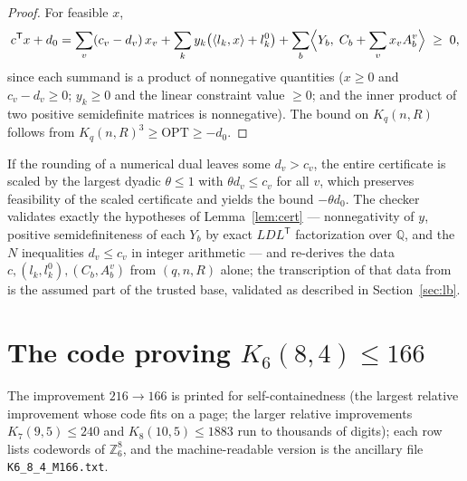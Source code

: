 \documentclass[11pt]{amsart}
\newcommand{\Kq}[3]{K_{#1}(#2,#3)}
\begin{document}
\begin{proof}
For feasible $x$,
\[
c^{\mathsf T}x + d_0
= \sum_v (c_v-d_v)\,x_v
+ \sum_k y_k\bigl(\langle l_k,x\rangle + l_k^0\bigr)
+ \sum_b \Bigl\langle Y_b,\; C_b+\sum_v x_v A_b^v\Bigr\rangle
\;\ge\; 0,
\]
since each summand is a product of nonnegative quantities ($x\ge 0$ and
$c_v-d_v\ge 0$; $y_k\ge 0$ and the linear constraint value $\ge 0$; and
the inner product of two positive semidefinite matrices is nonnegative).
The bound on $K_q(n,R)$ follows from
$K_q(n,R)^3\ge\mathrm{OPT}\ge -d_0$.
\end{proof}

If the rounding of a numerical dual leaves some $d_v>c_v$, the entire
certificate is scaled by the largest dyadic $\theta\le 1$ with
$\theta d_v\le c_v$ for all $v$, which preserves feasibility of the scaled
certificate and yields the bound $-\theta d_0$. The checker validates
exactly the hypotheses of Lemma~\ref{lem:cert} --- nonnegativity of $y$,
positive semidefiniteness of each $Y_b$ by exact $LDL^{\mathsf T}$
factorization over $\mathbb{Q}$, and the $N$ inequalities $d_v\le c_v$ in
integer arithmetic --- and re-derives the data
$c,(l_k,l_k^0),(C_b,A_b^v)$ from $(q,n,R)$ alone; the transcription of
that data from~\cite{GijswijtPolak} is the assumed part of the trusted
base, validated as described in Section~\ref{sec:lb}.

\section{The code proving $\Kq{6}{8}{4}\le 166$}\label{app:code}
The improvement $216\to 166$ is printed for self-containedness (the
largest relative improvement whose code fits on a page; the larger
relative improvements $\Kq{7}{9}{5}\le 240$ and $\Kq{8}{10}{5}\le 1883$
run to thousands of digits); each row lists codewords
of $\mathbb{Z}_6^8$, and the machine-readable version is the ancillary file
\texttt{K6\_8\_4\_M166.txt}.

{\scriptsize

}
\end{document}
